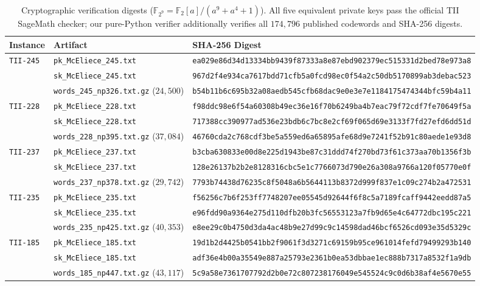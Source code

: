 \documentclass[11pt,a4paper]{article}
\begin{document}
\begin{table}[t]
\centering
\caption{Cryptographic verification digests ($\mathbb{F}_{2^9} = \mathbb{F}_2[a]/(a^9 + a^4 + 1)$). All five equivalent private keys pass the official TII SageMath checker; our pure-Python verifier additionally verifies all $174{,}796$ published codewords and SHA-256 digests.}
\label{tab:witnesses}
\scriptsize
\setlength{\tabcolsep}{4pt}
\begin{tabular}{lll}
\toprule
Instance & Artifact & SHA-256 Digest \\
\midrule
\texttt{TII-245} & \texttt{pk\_McEliece\_245.txt} & \texttt{ea029e86d34d13334bb9439f87333a8e87ebd902379ec515331d2bed78e973a8} \\
                 & \texttt{sk\_McEliece\_245.txt} & \texttt{967d2f4e934ca7617bdd71cfb5a0fcd98ec0f54a2c50db5170899ab3debac523} \\
                 & \texttt{words\_245\_np326.txt.gz} ($24{,}500$) & \texttt{b54b11b6c695b32a08aedb545cfb68dac9e0e3e7e1184175474344bfc59b4a11} \\
\midrule
\texttt{TII-228} & \texttt{pk\_McEliece\_228.txt} & \texttt{f98ddc98e6f54a60308b49ec36e16f70b6249ba4b7eac79f72cdf7fe70649f5a} \\
                 & \texttt{sk\_McEliece\_228.txt} & \texttt{717388cc390977ad536e23bdb6c7bc8e2cf69f065d69e3133f7fd27efd6dd51d} \\
                 & \texttt{words\_228\_np395.txt.gz} ($37{,}084$) & \texttt{46760cda2c768cdf3be5a559ed6a65895afe68d9e7241f52b91c80aede1e93d8} \\
\midrule
\texttt{TII-237} & \texttt{pk\_McEliece\_237.txt} & \texttt{b3cba630833e00d8e225d1943be87c31ddd74f270bd73f61c373aa70b1356f3b} \\
                 & \texttt{sk\_McEliece\_237.txt} & \texttt{128e26137b2b2e8128316cbc5e1c7766073d790e26a308a9766a120f05770e0f} \\
                 & \texttt{words\_237\_np378.txt.gz} ($29{,}742$) & \texttt{7793b74438d76235c8f5048a6b5644113b8372d999f837e1c09c274b2a472531} \\
\midrule
\texttt{TII-235} & \texttt{pk\_McEliece\_235.txt} & \texttt{f56256c7b6f253ff7748207ee05545d92644f6f8c5a7189fcaff9442eedd87a5} \\
                 & \texttt{sk\_McEliece\_235.txt} & \texttt{e96fdd90a9364e275d110dfb20b3fc56553123a7fb9d65e4c64772dbc195c221} \\
                 & \texttt{words\_235\_np425.txt.gz} ($40{,}353$) & \texttt{e8ee29c0b4750d3da4ac48b9e27d99c9c14598dad46bcf6526cd093e35d5329c} \\
\midrule
\texttt{TII-185} & \texttt{pk\_McEliece\_185.txt} & \texttt{19d1b2d4425b0541bb2f9061f3d3271c69159b95ce961014fefd79499293b140} \\
                 & \texttt{sk\_McEliece\_185.txt} & \texttt{adf36e4b00a35549e887a25793e2361b0ea53dbbae1ec888b7317a8532f1a9db} \\
                 & \texttt{words\_185\_np447.txt.gz} ($43{,}117$) & \texttt{5c9a58e7361707792d2b0e72c807238176049e545524c9c0d6b38af4e5670e55} \\
\bottomrule
\end{tabular}
\end{table}
\end{document}
